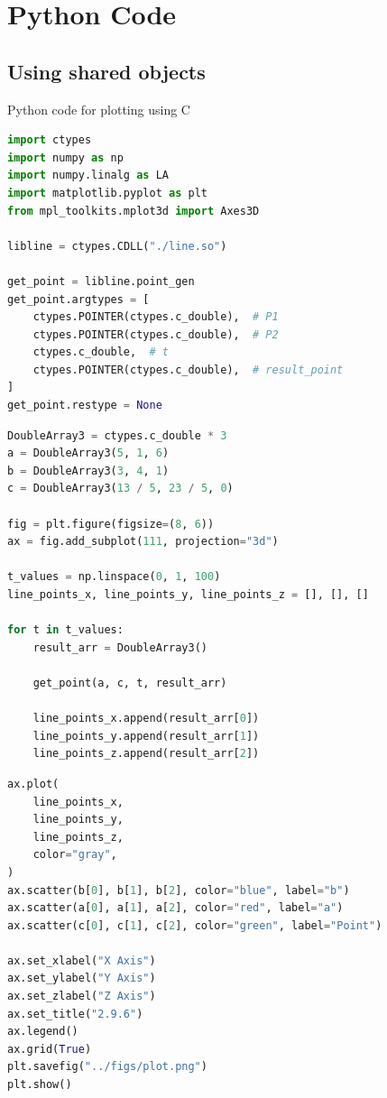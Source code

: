 \documentclass{beamer}
\theoremstyle{remark}
\numberwithin{equation}{section}
\begin{document}
\section{Python Code}
\subsection{Using shared objects}
\begin{frame}[fragile]{Python code for plotting using C}
\begin{lstlisting}[language=Python]
import ctypes
import numpy as np
import numpy.linalg as LA
import matplotlib.pyplot as plt
from mpl_toolkits.mplot3d import Axes3D

libline = ctypes.CDLL("./line.so")

get_point = libline.point_gen
get_point.argtypes = [
    ctypes.POINTER(ctypes.c_double),  # P1
    ctypes.POINTER(ctypes.c_double),  # P2
    ctypes.c_double,  # t
    ctypes.POINTER(ctypes.c_double),  # result_point
]
get_point.restype = None
\end{lstlisting}
\end{frame}
\begin{frame}[fragile]
 \begin{lstlisting}[language=Python]
DoubleArray3 = ctypes.c_double * 3
a = DoubleArray3(5, 1, 6)
b = DoubleArray3(3, 4, 1)
c = DoubleArray3(13 / 5, 23 / 5, 0)

fig = plt.figure(figsize=(8, 6))
ax = fig.add_subplot(111, projection="3d")

t_values = np.linspace(0, 1, 100)
line_points_x, line_points_y, line_points_z = [], [], []

for t in t_values:
    result_arr = DoubleArray3()

    get_point(a, c, t, result_arr)

    line_points_x.append(result_arr[0])
    line_points_y.append(result_arr[1])
    line_points_z.append(result_arr[2])
 \end{lstlisting}
\end{frame}
\begin{frame}[fragile]
 \begin{lstlisting}[language=Python]
ax.plot(
    line_points_x,
    line_points_y,
    line_points_z,
    color="gray",
)
ax.scatter(b[0], b[1], b[2], color="blue", label="b")
ax.scatter(a[0], a[1], a[2], color="red", label="a")
ax.scatter(c[0], c[1], c[2], color="green", label="Point")

ax.set_xlabel("X Axis")
ax.set_ylabel("Y Axis")
ax.set_zlabel("Z Axis")
ax.set_title("2.9.6")
ax.legend()
ax.grid(True)
plt.savefig("../figs/plot.png")
plt.show()
 \end{lstlisting}
\end{frame}
\end{document}
